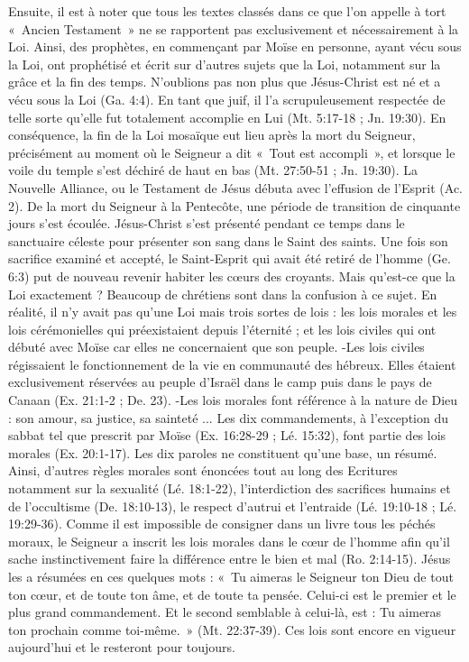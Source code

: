 \begin{multicols}{2}
{ Ensuite, il est à noter que tous les textes classés dans ce que l’on appelle à tort «~Ancien Testament~» ne se rapportent pas exclusivement et nécessairement à la Loi. Ainsi, des prophètes, en commençant par Moïse en personne,  ayant vécu sous la Loi, ont prophétisé et écrit sur d’autres sujets que la Loi, notamment sur la grâce et la fin des temps. N’oublions pas non plus que Jésus-Christ est né et a vécu sous la Loi (Ga. 4:4). En tant que juif, il l’a scrupuleusement respectée de telle sorte qu’elle fut totalement accomplie en Lui (Mt. 5:17-18 ; Jn. 19:30). En conséquence, la fin de la Loi mosaïque eut lieu après la mort du Seigneur, précisément au moment où le Seigneur a dit «~Tout est accompli~», et lorsque le voile du temple s’est déchiré de haut en bas (Mt. 27:50-51 ; Jn. 19:30). La Nouvelle Alliance, ou le Testament de Jésus débuta avec l’effusion de l’Esprit (Ac. 2). De la mort du Seigneur à la Pentecôte, une période de transition de cinquante jours s’est écoulée. Jésus-Christ s’est présenté pendant ce temps dans le sanctuaire céleste pour présenter son sang dans le Saint des saints. Une fois son sacrifice examiné et accepté, le Saint-Esprit qui avait été retiré de l’homme (Ge. 6:3) put de nouveau revenir habiter les cœurs des croyants. 
Mais qu’est-ce que la Loi exactement ?  Beaucoup de chrétiens sont dans la confusion à ce sujet.  En réalité, il n’y avait pas qu’une Loi mais trois sortes de lois : les  lois  morales et les lois cérémonielles  qui préexistaient depuis l’éternité ; et les lois civiles qui ont débuté avec Moïse car elles ne concernaient que son peuple.
-Les lois civiles régissaient le fonctionnement de la vie en communauté des hébreux. Elles étaient exclusivement réservées au peuple d’Israël dans le camp puis dans le pays de Canaan (Ex. 21:1-2 ; De. 23).
-Les lois morales font référence à la nature de Dieu : son amour, sa justice, sa sainteté ... Les dix commandements, à l’exception du sabbat tel que prescrit par Moïse (Ex. 16:28-29 ; Lé. 15:32), font partie des lois morales (Ex. 20:1-17). Les dix paroles ne constituent qu’une base, un résumé. Ainsi, d’autres règles morales sont énoncées tout au long des Ecritures notamment sur la sexualité (Lé. 18:1-22), l'interdiction des sacrifices humains et de l’occultisme (De. 18:10-13), le respect d’autrui et l’entraide (Lé. 19:10-18 ; Lé. 19:29-36). Comme il est impossible de consigner dans un livre tous les péchés moraux, le Seigneur a inscrit les lois morales dans le cœur de l’homme afin qu’il sache instinctivement faire la différence entre le bien et mal (Ro. 2:14-15). Jésus les a résumées en ces quelques mots : «~Tu aimeras le Seigneur ton Dieu de tout ton cœur, et de toute ton âme, et de toute ta pensée. Celui-ci est le premier et le plus grand commandement. Et le second semblable à celui-là, est : Tu aimeras ton prochain comme toi-même.~» (Mt. 22:37-39). Ces lois sont encore en vigueur aujourd’hui et le resteront pour toujours.
}
\end{multicols}
